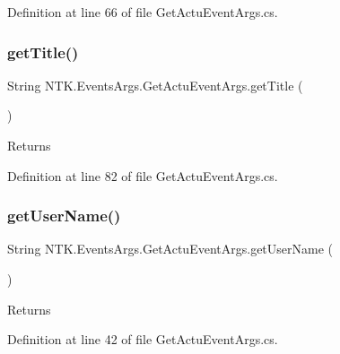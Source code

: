 Definition at line 66 of file Get\+Actu\+Event\+Args.\+cs.

\mbox{\label{class_n_t_k_1_1_events_args_1_1_get_actu_event_args_adefeaa435e837006f385776d556860a9}} 
\subsubsection{\texorpdfstring{getTitle()}{getTitle()}}
{\footnotesize\ttfamily String N\+T\+K.\+Events\+Args.\+Get\+Actu\+Event\+Args.\+get\+Title (\begin{DoxyParamCaption}{ }\end{DoxyParamCaption})}





\begin{DoxyReturn}{Returns}

\end{DoxyReturn}


Definition at line 82 of file Get\+Actu\+Event\+Args.\+cs.

\mbox{\label{class_n_t_k_1_1_events_args_1_1_get_actu_event_args_ae21cebd0f5470a64031ce126bc992d77}} 
\subsubsection{\texorpdfstring{getUserName()}{getUserName()}}
{\footnotesize\ttfamily String N\+T\+K.\+Events\+Args.\+Get\+Actu\+Event\+Args.\+get\+User\+Name (\begin{DoxyParamCaption}{ }\end{DoxyParamCaption})}





\begin{DoxyReturn}{Returns}

\end{DoxyReturn}


Definition at line 42 of file Get\+Actu\+Event\+Args.\+cs.

